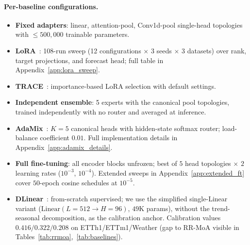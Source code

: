 \documentclass{article}
\begin{document}
\paragraph{Per-baseline configurations.}
\begin{itemize}[leftmargin=1.2em, itemsep=0.15em, topsep=0.2em]
\item \textbf{Fixed adapters}: linear, attention-pool, Conv1d-pool single-head topologies with $\leq 500{,}000$ trainable parameters.
\item \textbf{LoRA}~\citep{hu2022lora}: 108-run sweep (12 configurations $\times$ 3 seeds $\times$ 3 datasets) over rank, target projections, and forecast head; full table in Appendix~\ref{app:lora_sweep}.
\item \textbf{TRACE}~\citep{li2025trace}: importance-based LoRA selection with default settings.
\item \textbf{Independent ensemble}: 5 experts with the canonical pool topologies, trained independently with no router and averaged at inference.
\item \textbf{AdaMix}~\citep{wang2022adamix}: $K{=}5$ canonical heads with hidden-state softmax router; load-balance coefficient $0.01$. Full implementation details in Appendix~\ref{app:adamix_details}.
\item \textbf{Full fine-tuning}: all encoder blocks unfrozen; best of $5$ head topologies $\times$ $2$ learning rates ($10^{-3}$, $10^{-4}$). Extended sweeps in Appendix~\ref{app:extended_ft} cover $50$-epoch cosine schedules at $10^{-5}$.
\item \textbf{DLinear}~\citep{zeng2023dlinear}: from-scratch supervised; we use the simplified single-Linear variant ($\text{Linear}(L{=}512 \to H{=}96)$, $49$K params), without the trend-seasonal decomposition, as the calibration anchor. Calibration values $0.416 / 0.322 / 0.208$ on ETTh1/ETTm1/Weather (gap to RR-MoA visible in Tables~\ref{tab:rrmoa},~\ref{tab:baselines}).
\end{itemize}
\end{document}

